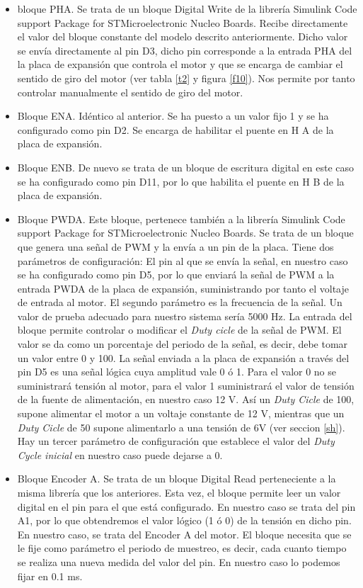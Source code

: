 \documentclass[10pt,a4paper]{report}
\begin{document}
\begin{itemize}
\item bloque PHA. Se trata de un bloque Digital Write de la librería Simulink Code support Package for STMicroelectronic Nucleo Boards. Recibe directamente el valor del bloque constante del modelo descrito anteriormente. Dicho valor se envía directamente al pin D3, dicho pin corresponde a la entrada PHA del la placa de expansión que controla el motor y que se encarga de cambiar el sentido de giro del motor (ver tabla \ref{t2} y figura \ref{f10}). Nos permite por tanto controlar manualmente el sentido de giro del motor.
\item Bloque ENA. Idéntico al anterior. Se ha puesto a un valor fijo 1 y se ha configurado como pin D2. Se encarga de habilitar el puente en H A de la placa de expansión.
\item Bloque ENB. De nuevo se trata de un bloque de escritura digital en este caso se ha configurado como pin D11, por lo que habilita el puente en H B de la placa de expansión.
\item Bloque PWDA. Este bloque, pertenece también a la librería Simulink Code support Package for STMicroelectronic Nucleo Boards. Se trata de un bloque que genera una señal de PWM y la envía a un pin de la placa. Tiene dos parámetros de configuración: El pin al que se envía la señal, en nuestro caso se ha configurado como pin D5, por lo que enviará la señal de PWM a la entrada PWDA de la placa de expansión, suministrando por tanto el voltaje de entrada al motor. El segundo parámetro es la frecuencia de la señal. Un valor de prueba adecuado para nuestro sistema sería 5000 Hz. La entrada del bloque permite controlar o modificar el \emph{Duty cicle} de la señal de PWM. El valor se da como un porcentaje del periodo de la señal, es decir, debe tomar un valor entre 0 y 100. La señal enviada a la placa de expansión a través del pin D5 es una señal lógica cuya amplitud vale 0 ó 1. Para el valor 0 no se suministrará tensión al motor, para el valor 1 suministrará el valor de tensión de la fuente de alimentación, en nuestro caso 12 V. Así un \emph{Duty Cicle} de 100, supone alimentar el motor a un voltaje constante de 12 V, mientras que un \emph{Duty Cicle} de 50 supone alimentarlo a una tensión de 6V (ver seccion \ref{sh}). Hay un tercer parámetro de configuración que establece el valor del \emph{Duty Cycle inicial} en nuestro caso puede dejarse a 0.

\item Bloque Encoder A. Se trata de un bloque Digital Read perteneciente a la misma librería que los anteriores. Esta vez, el bloque permite leer un valor digital en el pin para el que está configurado. En nuestro caso se trata del pin A1, por lo que obtendremos el valor lógico (1 ó 0) de la tensión en dicho pin. En nuestro caso, se trata del Encoder A  del motor. El bloque necesita que se le fije como parámetro el periodo de muestreo, es decir, cada cuanto tiempo se realiza una nueva medida del valor del pin.  En nuestro caso lo podemos fijar en 0.1 ms.


\end{itemize}
\end{document}
